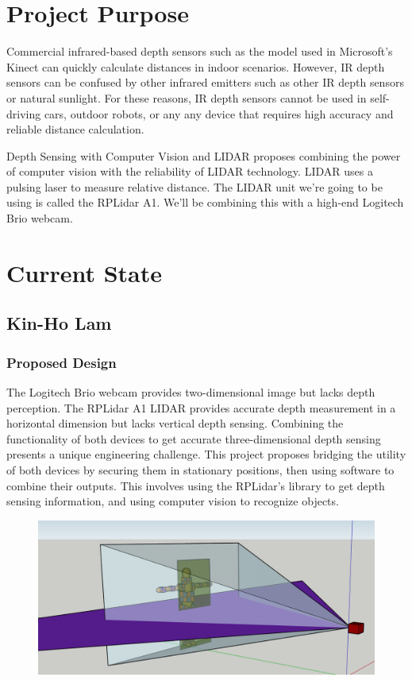 \documentclass[onecolumn, draftclsnofoot,10pt, compsoc]{IEEEtran}
\begin{document}
\begin{singlespace}
	\section{Project Purpose}
		Commercial infrared-based depth sensors such as the model used in Microsoft's Kinect can quickly calculate distances in indoor scenarios.
		However, IR depth sensors can be confused by other infrared emitters such as other IR depth sensors or natural sunlight.
		For these reasons, IR depth sensors cannot be used in self-driving cars, outdoor robots, or any any device that requires high accuracy and reliable distance calculation.

		Depth Sensing with Computer Vision and LIDAR proposes combining the power of computer vision with the reliability of LIDAR technology.
		LIDAR uses a pulsing laser to measure relative distance.
		The LIDAR unit we're going to be using is called the RPLidar A1.
		We'll be combining this with a high-end Logitech Brio webcam.

	\section{Current State}

	\subsection{Kin-Ho Lam}
		\subsubsection{Proposed Design}
			The Logitech Brio webcam provides two-dimensional image but lacks depth perception.
			The RPLidar A1 LIDAR provides accurate depth measurement in a horizontal dimension but lacks vertical depth sensing.
			Combining the functionality of both devices to get accurate three-dimensional depth sensing presents a unique engineering challenge.
			This project proposes bridging the utility of both devices by securing them in stationary positions, then using software to combine their outputs.
			This involves using the RPLidar's library to get depth sensing information, and using computer vision to recognize objects.
			
			\begin{figure}[here]
				\includegraphics[scale=0.5, width=\textwidth]{different_dimensions.PNG}
				\label{dimensions}
			\end{figure}


\end{singlespace}
\end{document}
